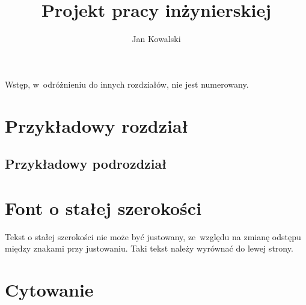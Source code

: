 \documentclass[
  tocchapter,       %
  tocchapterdots,   %
  sectionnumberdot, %
]{wsbthesis}
\author{Jan Kowalski}
\title{Projekt pracy inżynierskiej}
\begin{document}
\maketitle{}
\printtableofcontent{}

\begin{introduction}
Wstęp, w~odróżnieniu do innych rozdziałów, nie jest numerowany.

\end{introduction}


\chapter{Przykładowy rozdział}
\section{Przykładowy podrozdział}

\chapter{Font o stałej szerokości}
Tekst o stałej szerokości nie może być justowany, ze~względu na zmianę odstępu
między znakami przy justowaniu. Taki tekst należy wyrównać do lewej strony.
\begin{flushleft}
    \ttfamily{} %
\end{flushleft}

\chapter{Cytowanie}
\end{document}
